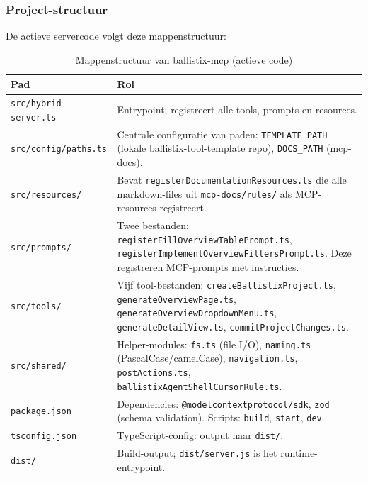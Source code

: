 \subsubsection{Project-structuur}

De actieve servercode volgt deze mappenstructuur:

\begin{table}[htbp]
  \centering
  \caption{Mappenstructuur van ballistix-mcp (actieve code)}
  \label{tab:mcp-structure}
  \small
  \begin{tabularx}{\textwidth}{|l|X|}
    \hline
    \textbf{Pad} & \textbf{Rol} \\
    \hline
    \texttt{src/hybrid-server.ts} & 
    Entrypoint; registreert alle tools, prompts en resources. \\
    \hline
    \texttt{src/config/paths.ts} &
    Centrale configuratie van paden: \texttt{TEMPLATE\_PATH} (lokale ballistix-tool-template repo), \texttt{DOCS\_PATH} (mcp-docs). \\
    \hline
    \texttt{src/resources/} &
    Bevat \texttt{registerDocumentationResources.ts} die alle markdown-files uit \texttt{mcp-docs/rules/} als MCP-resources registreert. \\
    \hline
    \texttt{src/prompts/} &
    Twee bestanden: \texttt{registerFillOverviewTablePrompt.ts}, \texttt{registerImplementOverviewFiltersPrompt.ts}. Deze registreren MCP-prompts met instructies. \\
    \hline
    \texttt{src/tools/} &
    Vijf tool-bestanden: \texttt{createBallistixProject.ts}, \texttt{generateOverviewPage.ts}, \texttt{generateOverviewDropdownMenu.ts}, \texttt{generateDetailView.ts}, \texttt{commitProjectChanges.ts}. \\
    \hline
    \texttt{src/shared/} &
    Helper-modules: \texttt{fs.ts} (file I/O), \texttt{naming.ts} (PascalCase/camelCase), \texttt{navigation.ts}, \texttt{postActions.ts}, \texttt{ballistixAgentShellCursorRule.ts}. \\
    \hline
    \texttt{package.json} &
    Dependencies: \texttt{@modelcontextprotocol/sdk}, \texttt{zod} (schema validation). Scripts: \texttt{build}, \texttt{start}, \texttt{dev}. \\
    \hline
    \texttt{tsconfig.json} &
    TypeScript-config: output naar \texttt{dist/}. \\
    \hline
    \texttt{dist/} &
    Build-output; \texttt{dist/server.js} is het runtime-entrypoint. \\
    \hline
  \end{tabularx}
\end{table}

